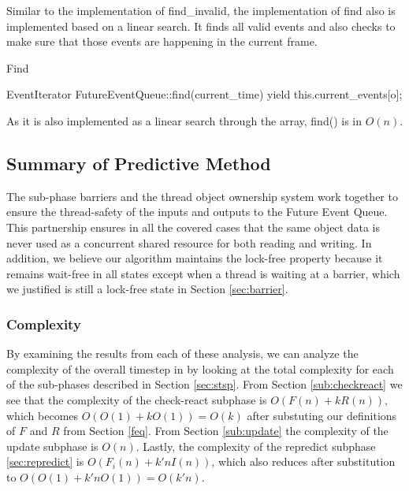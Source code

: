 \documentclass[CEJCS,PDF]{cej} %
\begin{document}
Similar to the implementation of find\_invalid, the implementation of find also is implemented based on a linear search.  It finds all valid events
and also checks to make sure that those events are happening in the current frame.

\begin{algorithm}
\caption{Find}
\begin{algorithmic}
\STATE EventIterator FutureEventQueue::find(current\_time)
		\STATE {}
		\STATE yield this.current\_events[o];
	\ENDIF
\ENDFOR
\end{algorithmic}
\end{algorithm}

As it is also implemented as a linear search through the array, find() is in $O(n)$.

\subsection{Summary of Predictive Method}
	The sub-phase barriers and the thread object ownership system work together to ensure the thread-safety of the inputs and outputs to the Future Event Queue.
This partnership ensures in all the covered cases that the same object data is never used as a concurrent shared resource for both reading and writing.  In addition, we believe our algorithm maintains
the lock-free property because it remains wait-free in all states except when a thread is waiting at a barrier, which we justified is still a lock-free state in Section \ref{sec:barrier}.

\subsubsection{Complexity}

By examining the results from each of these analysis, we can analyze the complexity of the overall timestep in by looking at the total complexity for each of the sub-phases described in Section \ref{sec:stsp}.
From Section \ref{sub:checkreact} we see that the complexity of the check-react subphase is $O(F(n)+k R(n))$, which becomes $O(O(1)+kO(1))=O(k)$ after substuting our definitions of $F$ and $R$ from Section \ref{feq}.
From Section \ref{sub:update} the complexity of the update subphase is $O(n)$.  
Lastly, the complexity of the repredict subphase \ref{sec:repredict} is $O(F_i(n)+k' n I(n))$, which also reduces after substitution to $O(O(1)+k' n O(1))=O(k'n)$.
\end{document}
